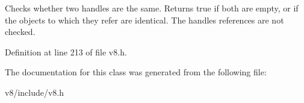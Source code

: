 Checks whether two handles are the same. Returns true if both are empty, or if the objects to which they refer are identical. The handles\textquotesingle{} references are not checked. 

Definition at line 213 of file v8.\+h.



The documentation for this class was generated from the following file\+:\begin{DoxyCompactItemize}
\item 
v8/include/v8.\+h\end{DoxyCompactItemize}
